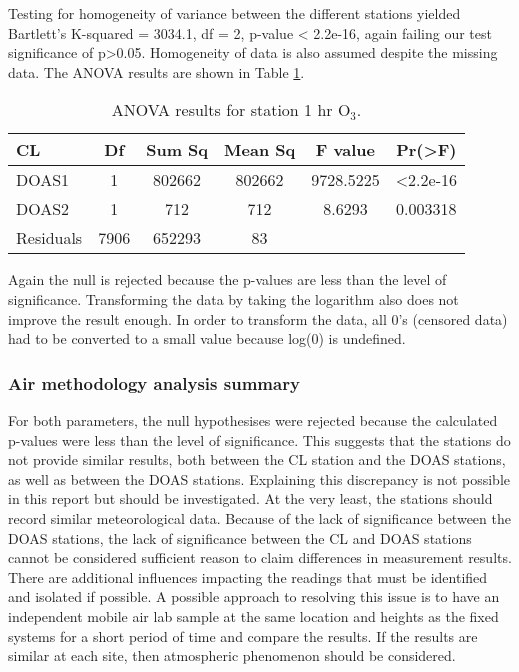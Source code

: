 Testing for  homogeneity of variance between the different stations yielded Bartlett's K-squared = 3034.1, df = 2, p-value < 2.2e-16, again failing our test significance of p>0.05. Homogeneity of data is also assumed despite the missing data. The ANOVA results are shown in Table \ref{tab:anovao3}.

\begin{table}[H]
\centering
\caption{ANOVA results for station 1 hr O$_{3}$. }
\label{tab:anovao3}
\begin{tabular}{@{}lccccc@{}}
\toprule
\textbf{CL} & \textbf{Df} & \textbf{Sum Sq} & \textbf{Mean Sq} & \textbf{F value} & \textbf{Pr(>F)} \\ \midrule
DOAS1 & 1 & 802662 & 802662 & 9728.5225 & \textless 2.2e-16 \\
DOAS2 & 1 & 712 & 712 & 8.6293 & 0.003318 \\
Residuals & 7906 & 652293 & 83 &  &  \\ \bottomrule
\end{tabular}
\end{table}

Again the null is rejected because the p-values are less than the level of significance. Transforming the data by taking the logarithm also does not improve the result enough. In order to transform the data, all 0's (censored data) had to be converted to a small value because log(0) is undefined. 

\subsubsection{Air methodology analysis summary}

For both parameters, the null hypothesises were rejected because the calculated p-values were less than the level of significance. This suggests that the stations do not provide similar results, both between the CL station and the DOAS stations, as well as between the DOAS stations. Explaining this discrepancy is not possible in this report but should be investigated. At the very least, the stations should record similar meteorological data. Because of the lack of significance between the DOAS stations, the lack of significance between the CL and DOAS stations cannot be considered sufficient reason to claim differences in measurement results. There are additional influences impacting the readings that must be identified and isolated if possible. A possible approach to resolving this issue is to have an independent mobile air lab sample at the same location and heights as the fixed systems for a short period of time and compare the results. If the results are similar at each site, then atmospheric phenomenon should be considered.

